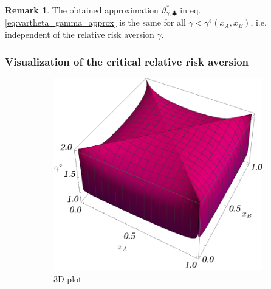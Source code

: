 \documentclass{article}
\theoremstyle{definition}
\newtheorem*{remark}{Remark}
\begin{document}
\begin{remark}
    The obtained approximation $\vartheta^*_{\gamma,\clubsuit}$ in eq. \eqref{eq:vartheta_gamma_approx} is the same for all $\gamma < \gamma^\diamond(x_A,x_B)$, i.e. independent of the relative risk aversion $\gamma$.
    
\end{remark}

\subsubsection{Visualization of the critical relative risk aversion}

\begin{figure}[H]
    \centering
    \begin{subfigure}[b]{0.45\textwidth}
        \includegraphics[width=\textwidth]{img/gamma_diamond_3D.png}
        \caption{3D plot}
        \label{fig:gamma_diamond_3D}
    \end{subfigure}
    \hspace{0.05\textwidth} %
    \begin{subfigure}[b]{0.45\textwidth}

\end{subfigure}
\end{figure}
\end{document}

